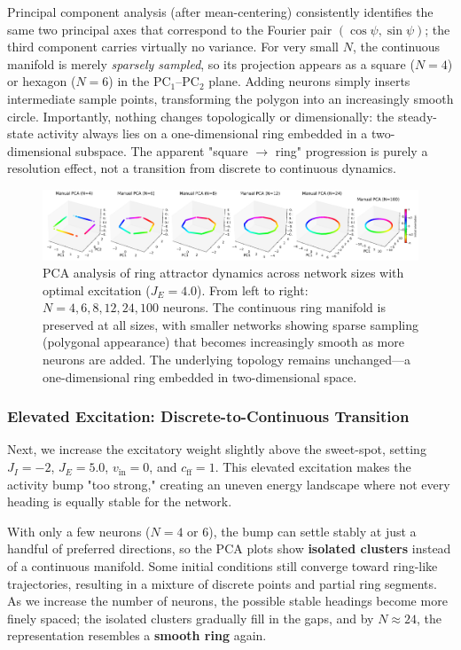 \documentclass[11pt,a4paper]{article}
\begin{document}
Principal component analysis (after mean-centering) consistently identifies the same two principal axes that correspond to the Fourier pair $(\cos\psi, \sin\psi)$; the third component carries virtually no variance. For very small $N$, the continuous manifold is merely \emph{sparsely sampled}, so its projection appears as a square ($N=4$) or hexagon ($N=6$) in the $\text{PC}_1$–$\text{PC}_2$ plane. Adding neurons simply inserts intermediate sample points, transforming the polygon into an increasingly smooth circle. Importantly, nothing changes topologically or dimensionally: the steady-state activity always lies on a one-dimensional ring embedded in a two-dimensional subspace. The apparent "square $\to$ ring" progression is purely a resolution effect, not a transition from discrete to continuous dynamics.

\begin{figure}[H]
\centering
\includegraphics[width=1.0\textwidth]{manual_pca_varying_N_ring.png}
\caption{PCA analysis of ring attractor dynamics across network sizes with optimal excitation ($J_E = 4.0$). From left to right: $N = 4, 6, 8, 12, 24, 100$ neurons. The continuous ring manifold is preserved at all sizes, with smaller networks showing sparse sampling (polygonal appearance) that becomes increasingly smooth as more neurons are added. The underlying topology remains unchanged—a one-dimensional ring embedded in two-dimensional space.}
\label{fig:network_size_optimal}
\end{figure}

\subsubsection*{Elevated Excitation: Discrete-to-Continuous Transition}

Next, we increase the excitatory weight slightly above the sweet-spot, setting $J_I = -2$, $J_E = 5.0$, $v_{\text{in}} = 0$, and $c_{\text{ff}} = 1$. This elevated excitation makes the activity bump "too strong," creating an uneven energy landscape where not every heading is equally stable for the network.

With only a few neurons ($N = 4$ or $6$), the bump can settle stably at just a handful of preferred directions, so the PCA plots show \textbf{isolated clusters} instead of a continuous manifold. Some initial conditions still converge toward ring-like trajectories, resulting in a mixture of discrete points and partial ring segments. As we increase the number of neurons, the possible stable headings become more finely spaced; the isolated clusters gradually fill in the gaps, and by $N \approx 24$, the representation resembles a \textbf{smooth ring} again. 
\end{document}
